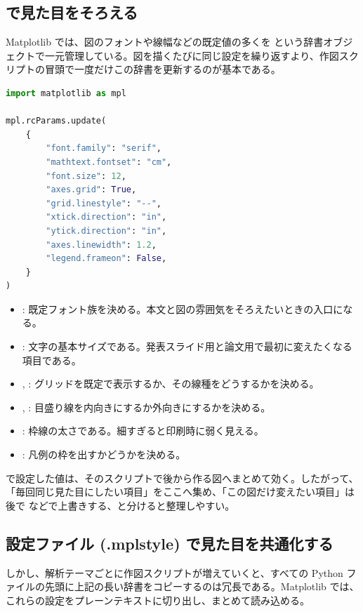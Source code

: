 \subsection{ で見た目をそろえる}

Matplotlib では、図のフォントや線幅などの既定値の多くを  という辞書オブジェクトで一元管理している。図を描くたびに同じ設定を繰り返すより、作図スクリプトの冒頭で一度だけこの辞書を更新するのが基本である。

\begin{lstlisting}[language=Python]
import matplotlib as mpl

mpl.rcParams.update(
    {
        "font.family": "serif",
        "mathtext.fontset": "cm",
        "font.size": 12,
        "axes.grid": True,
        "grid.linestyle": "--",
        "xtick.direction": "in",
        "ytick.direction": "in",
        "axes.linewidth": 1.2,
        "legend.frameon": False,
    }
)
\end{lstlisting}

\begin{itemize}
\item {}: 既定フォント族を決める。本文と図の雰囲気をそろえたいときの入口になる。
\item {}: 文字の基本サイズである。発表スライド用と論文用で最初に変えたくなる項目である。
\item {}, : グリッドを既定で表示するか、その線種をどうするかを決める。
\item {}, : 目盛り線を内向きにするか外向きにするかを決める。
\item {}: 枠線の太さである。細すぎると印刷時に弱く見える。
\item {}: 凡例の枠を出すかどうかを決める。
\end{itemize}

 で設定した値は、そのスクリプトで後から作る図へまとめて効く。したがって、「毎回同じ見た目にしたい項目」をここへ集め、「この図だけ変えたい項目」は後で  などで上書きする、と分けると整理しやすい。

\subsection{設定ファイル (.mplstyle) で見た目を共通化する}

しかし、解析テーマごとに作図スクリプトが増えていくと、すべての Python ファイルの先頭に上記の長い辞書をコピーするのは冗長である。Matplotlib では、これらの設定をプレーンテキストに切り出し、まとめて読み込める。

